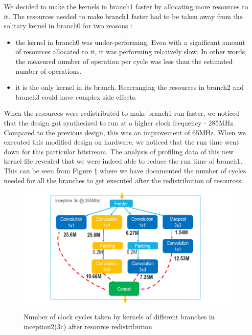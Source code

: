 We decided to make the kernels in branch1 faster by allocating more resources to it. The resources needed to make branch1 faster had to be taken away from the solitary kernel in branch0 for two reasons : 
\begin{itemize}
    \item the kernel in branch0 was under-performing. Even with a significant amount of resources allocated to it, it was performing relatively slow. In other words, the measured number of operation per cycle was less than the estimated number of operations.
    \item it is the only kernel in its branch. Rearranging the resources in branch2 and branch3 could have complex side effects.
\end{itemize}

When the resources were redistributed to make branch1 run faster, we noticed that the design got synthesized to run at a higher clock frequency - 285MHz. Compared to the previous design, this was an improvement of 65MHz. When we executed this modified design on hardware, we noticed that the run time went down for this particular bitstream. The analysis of profiling data of this new kernel file revealed that we were indeed able to reduce the run time of branch1. This can be seen from Figure \ref{fig:GoogLeNet_Hybrid_After_Opt} where we have documented the number of cycles needed for all the branches to get executed after the redistribution of resources.  

 \begin{figure}[!htb]
  \includegraphics[width=\textwidth,height=\textheight,keepaspectratio]{img/GoogLeNet_Hybrid_After_Opt.png}
  \caption{Number of clock cycles taken by kernels of different branches in inception2(3c) after resource redistribution}
  \label{fig:GoogLeNet_Hybrid_After_Opt}
\end{figure}

